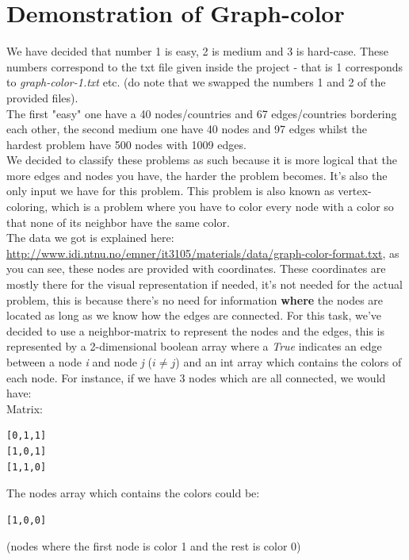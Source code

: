 \documentclass[12pt, a4paper]{article}
\begin{document}
\section{Demonstration of Graph-color}
We have decided that number 1 is easy, 2 is medium and 3 is hard-case.  These numbers correspond to the txt file given inside the project - that is 1 corresponds to \textit{graph-color-1.txt} etc. (do note that we swapped the numbers 1 and 2 of the provided files).\\
The first "easy" one have a 40 nodes/countries and 67 edges/countries bordering each other, the second medium one have 40 nodes and 97 edges whilst the hardest problem have 500 nodes with 1009 edges.\\ 
We decided to classify these problems as such because it is more logical that the more edges and nodes you have, the harder the problem becomes. It's also the only input we have for this problem.
This problem is also known as vertex-coloring, which is a problem where you have to color every node with a color so that none of its neighbor have the same color.\\
The data we got is explained here:\\ \href{http://www.idi.ntnu.no/emner/it3105/materials/data/graph-color-format.txt}{http://www.idi.ntnu.no/emner/it3105/materials/data/graph-color-format.txt},
as you can see, these nodes are provided with coordinates. These coordinates are mostly there for the visual representation if needed, it's not needed for the actual problem, this is because there's no need for information \textbf{where} the nodes are located as long as we know how the edges are connected. For this task, we've decided to use a neighbor-matrix to represent the nodes and the edges, this is represented by a 2-dimensional boolean array where a \textit{True} indicates an edge between a node \textit{i} and node \textit{j} ($i \neq j$) and an int array which contains the colors of each node. For instance, if we have 3 nodes which are all connected, we would have:\\
Matrix:\\
\begin{center}
\begin{verbatim}
[0,1,1]
[1,0,1]
[1,1,0]
\end{verbatim}
\end{center}
The nodes array which contains the colors could be:
\begin{center}
\begin{verbatim}
[1,0,0]
\end{verbatim}
\end{center} (nodes where the first node is color 1 and the rest is color 0)\\
\end{document}

